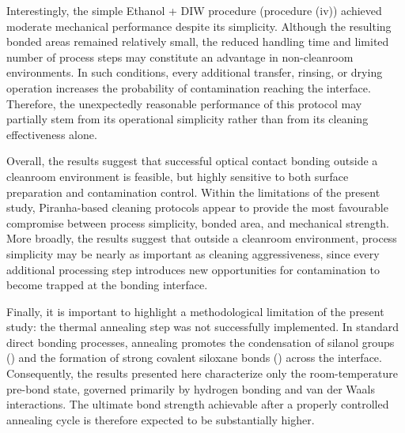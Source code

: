 Interestingly, the simple Ethanol + DIW procedure (procedure (iv)) achieved
moderate mechanical performance despite its simplicity. Although the
resulting bonded areas remained relatively small, the reduced handling time
and limited number of process steps may constitute an advantage in
non-cleanroom environments. In such conditions, every additional transfer,
rinsing, or drying operation increases the probability of contamination
reaching the interface. Therefore, the unexpectedly reasonable performance
of this protocol may partially stem from its operational simplicity rather
than from its cleaning effectiveness alone.

Overall, the results suggest that successful optical contact bonding outside
a cleanroom environment is feasible, but highly sensitive to both surface
preparation and contamination control. Within the limitations of the present
study, Piranha-based cleaning protocols appear to provide the most
favourable compromise between process simplicity, bonded area, and
mechanical strength. More broadly, the results suggest that outside a
cleanroom environment, process simplicity may be nearly as important as
cleaning aggressiveness, since every additional processing step introduces
new opportunities for contamination to become trapped at the bonding
interface.

Finally, it is important to highlight a methodological limitation of the
present study: the thermal annealing step was not successfully implemented.
In standard direct bonding processes, annealing promotes the condensation of
silanol groups () and the formation of strong covalent siloxane
bonds () across the interface. Consequently, the results
presented here characterize only the room-temperature pre-bond state,
governed primarily by hydrogen bonding and van der Waals interactions. The
ultimate bond strength achievable after a properly controlled annealing
cycle is therefore expected to be substantially higher.
